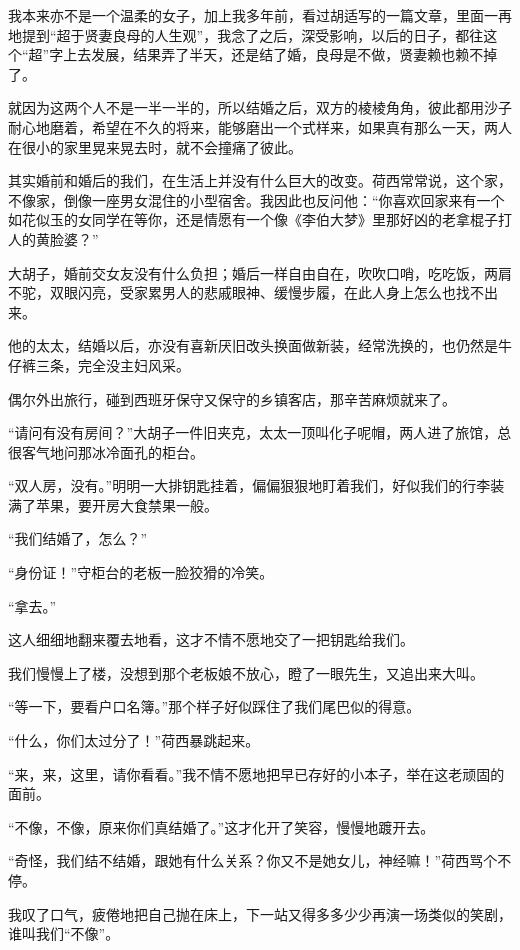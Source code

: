 \par 我本来亦不是一个温柔的女子，加上我多年前，看过胡适写的一篇文章，里面一再地提到“超于贤妻良母的人生观”，我念了之后，深受影响，以后的日子，都往这个“超”字上去发展，结果弄了半天，还是结了婚，良母是不做，贤妻赖也赖不掉了。
\par 就因为这两个人不是一半一半的，所以结婚之后，双方的棱棱角角，彼此都用沙子耐心地磨着，希望在不久的将来，能够磨出一个式样来，如果真有那么一天，两人在很小的家里晃来晃去时，就不会撞痛了彼此。
\par 其实婚前和婚后的我们，在生活上并没有什么巨大的改变。荷西常常说，这个家，不像家，倒像一座男女混住的小型宿舍。我因此也反问他：“你喜欢回家来有一个如花似玉的女同学在等你，还是情愿有一个像《李伯大梦》里那好凶的老拿棍子打人的黄脸婆？”
\par 大胡子，婚前交女友没有什么负担；婚后一样自由自在，吹吹口哨，吃吃饭，两肩不驼，双眼闪亮，受家累男人的悲戚眼神、缓慢步履，在此人身上怎么也找不出来。
\par 他的太太，结婚以后，亦没有喜新厌旧改头换面做新装，经常洗换的，也仍然是牛仔裤三条，完全没主妇风采。
\par 偶尔外出旅行，碰到西班牙保守又保守的乡镇客店，那辛苦麻烦就来了。
\par “请问有没有房间？”大胡子一件旧夹克，太太一顶叫化子呢帽，两人进了旅馆，总很客气地问那冰冷面孔的柜台。
\par “双人房，没有。”明明一大排钥匙挂着，偏偏狠狠地盯着我们，好似我们的行李装满了苹果，要开房大食禁果一般。
\par “我们结婚了，怎么？”
\par “身份证！”守柜台的老板一脸狡猾的冷笑。
\par “拿去。”
\par 这人细细地翻来覆去地看，这才不情不愿地交了一把钥匙给我们。
\par 我们慢慢上了楼，没想到那个老板娘不放心，瞪了一眼先生，又追出来大叫。
\par “等一下，要看户口名簿。”那个样子好似踩住了我们尾巴似的得意。
\par “什么，你们太过分了！”荷西暴跳起来。
\par “来，来，这里，请你看看。”我不情不愿地把早已存好的小本子，举在这老顽固的面前。
\par “不像，不像，原来你们真结婚了。”这才化开了笑容，慢慢地踱开去。
\par “奇怪，我们结不结婚，跟她有什么关系？你又不是她女儿，神经嘛！”荷西骂个不停。
\par 我叹了口气，疲倦地把自己抛在床上，下一站又得多多少少再演一场类似的笑剧，谁叫我们“不像”。
